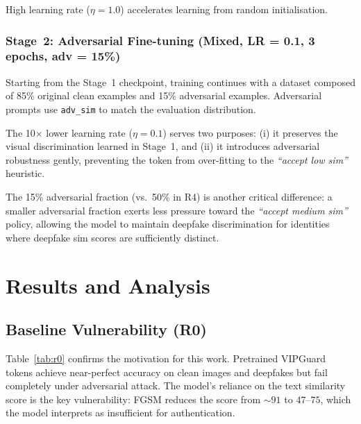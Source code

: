 \documentclass[12pt,a4paper]{article}
\begin{document}
High learning rate ($\eta = 1.0$) accelerates learning from random initialisation.

\subsubsection*{Stage~2: Adversarial Fine-tuning (Mixed, LR = 0.1, 3 epochs, adv = 15\%)}

Starting from the Stage~1 checkpoint, training continues with a dataset composed
of 85\% original clean examples and 15\% adversarial examples.  Adversarial
prompts use \texttt{adv\_sim} to match the evaluation distribution.

The 10$\times$ lower learning rate ($\eta = 0.1$) serves two purposes:
(i) it preserves the visual discrimination learned in Stage~1, and
(ii) it introduces adversarial robustness gently, preventing the token from
over-fitting to the \emph{``accept low sim''} heuristic.

The 15\% adversarial fraction (vs.\ 50\% in R4) is another critical difference:
a smaller adversarial fraction exerts less pressure toward the \emph{``accept
medium sim''} policy, allowing the model to maintain deepfake discrimination
for identities where deepfake sim scores are sufficiently distinct.

\section{Results and Analysis}
\label{sec:results}

\subsection{Baseline Vulnerability (R0)}

Table~\ref{tab:r0} confirms the motivation for this work.  Pretrained VIPGuard
tokens achieve near-perfect accuracy on clean images and deepfakes but fail
completely under adversarial attack.  The model's reliance on the text similarity
score is the key vulnerability: FGSM reduces the score from $\sim\!91$ to
$47$--$75$, which the model interprets as insufficient for authentication.
\end{document}
